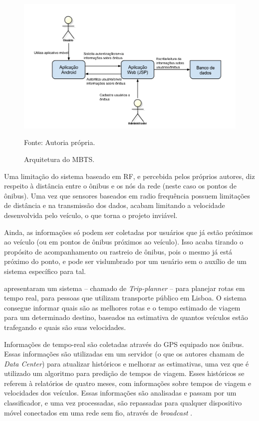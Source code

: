 \begin{figure}[h]
\begin{center}
    \includegraphics[width=1\columnwidth]{../figs/arquitetura_mbts.png}
    \caption{Arquitetura do MBTS.}Fonte: Autoria própria.%
    \label{fig:archMBTS}
\end{center}
\end{figure}

Uma limitação do sistema baseado em RF, e percebida pelos próprios autores, diz respeito à distância entre o ônibus e os nós da rede (neste caso os pontos de ônibus). Uma vez que sensores baseados em radio frequência possuem limitações de distância e na transmissão dos dados, acabam limitando a velocidade desenvolvida pelo veículo, o que torna o projeto inviável. 

Ainda, as informações só podem ser coletadas por usuários que já estão próximos ao veículo (ou em pontos de ônibus próximos ao veículo). Isso acaba tirando o propósito de acompanhamento ou rastreio de ônibus, pois o mesmo já está próximo do ponto, e pode ser vislumbrado por um usuário sem o auxílio de um sistema específico para tal.

 apresentaram um sistema -- chamado de \emph{Trip-planner} -- para planejar rotas em tempo real, para pessoas que utilizam transporte público em Lisboa. O sistema consegue informar quais são as melhores rotas e o tempo estimado de viagem para um determinado destino, baseados na estimativa de quantos veículos estão trafegando e quais são suas velocidades.

Informações de tempo-real são coletadas através do GPS equipado nos ônibus. Essas informações são utilizadas em um servidor (o que os autores chamam de \emph{Data Center}) para atualizar históricos e melhorar as estimativas, uma vez que é utilizado um algoritmo para predição de tempos de viagem. Esses históricos se referem à relatórios de quatro meses, com informações sobre tempos de viagem e velocidades dos veículos. Essas informações são analisadas e passam por um classificador, e uma vez processadas, são repassadas para qualquer dispositivo móvel conectados em uma rede sem fio, através de \emph{broadcast} \cite{alves}.


